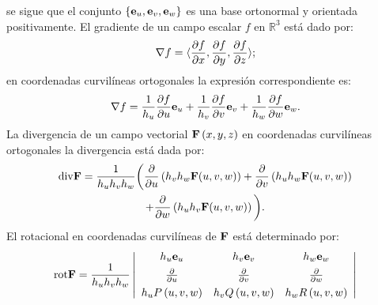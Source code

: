 se sigue que el conjunto  $\{ \mathbf{e}_{u},\mathbf{e}_{v},\mathbf{e}_{w} \}$
es una base ortonormal y orientada positivamente.
El gradiente de un campo escalar $f$ en $\mathbb{R}^{3}$ está dado por:
\[\nabla f=\langle \frac{\partial f}{\partial x},\frac{\partial f}{\partial y},
\frac{\partial f}{\partial z}\rangle;\]
en coordenadas curvilíneas ortogonales la expresión correspondiente es:
\[\nabla f= \frac{1}{h_{u}}\frac{\partial f}{\partial u}\mathbf{e}_{u}+\frac{1}{h_{v}}\frac{\partial f}{\partial v}\mathbf{e}_{v}+\frac{1}{h_{w}}\frac{\partial f}{\partial w}\mathbf{e}_{w}.\]
La divergencia de un campo vectorial ${\bf F}\left(x,y,z\right)$
en coordenadas curvilíneas ortogonales la divergencia está dada por:
\begin{multline*}
{\rm div}{\bf F}=\frac{1}{h_{u}h_{v}h_{w}}\bigg(
\frac{\partial}{\partial u} \left(h_{v}h_{w}{\bf F}(u,v,w)\right)
+\frac{\partial}{\partial v}\left(h_{u}h_{w}{\bf F}(u,v,w) \right) \\
+\frac{\partial}{\partial w}\left(h_{u}h_{v}{\bf F}(u,v,w) \right) \bigg).
\end{multline*}
El rotacional en coordenadas curvilíneas  de ${\bf F}$ está determinado por:
\begin{gather*}
{\rm rot}{\bf F}=\frac{1}{h_{u}h_{v}h_{w}}\left\vert
\begin{array}{ccc}
h_{u}\mathbf{e}_{u} & h_{v}\mathbf{e}_{v} & h_{w}\mathbf{e}_{w} \\[0.15cm]
\frac{\partial }{\partial u} & \frac{\partial }{\partial v} & \frac{\partial
}{\partial w} \\[0.15cm]
h_{u}P\left( u,v,w\right)  & h_{v}Q\left( u,v,w\right)  & h_{w}R\left(
u,v,w\right)
\end{array} \right\vert
\end{gather*}


